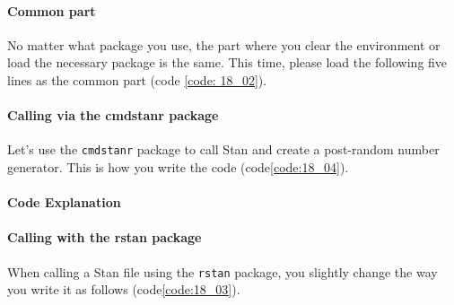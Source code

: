 \documentclass{ltjsbook}
\begin{document}
\paragraph{Common part}
No matter what package you use, the part where you clear the environment or load the necessary package is the same. This time, please load the following five lines as the common part (code \ref{code: 18_02}).



\paragraph{Calling via the cmdstanr package}

Let's use the \texttt{cmdstanr} package to call Stan and create a post-random number generator. This is how you write the code (code\ref{code:18_04}).


\paragraph{Code Explanation}



\paragraph{Calling with the rstan package}

When calling a Stan file using the \texttt{rstan} package, you slightly change the way you write it as follows (code\ref{code:18_03}).
\end{document}
